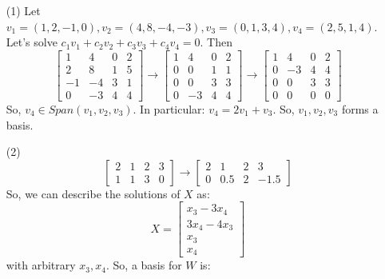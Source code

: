 %
%
\begin{itemize}
\item[(1)]
Let $v_1 = (1, 2, -1, 0), v_2 = (4, 8, -4, -3), v_3 = (0, 1, 3, 4), v_4 = (2, 5, 1, 4)$. Let's solve $c_1v_1 + c_2v_2 + c_3v_3 + c_4v_4 = 0$. Then
$$\begin{bmatrix}
1 & 4 & 0 & 2 \\
2 & 8 & 1 & 5 \\
-1 & -4 & 3 & 1 \\
0 & -3 & 4 & 4
\end{bmatrix} \rightarrow \begin{bmatrix}
1 & 4 & 0 & 2 \\
0 & 0 & 1 & 1 \\
0 & 0 & 3 & 3 \\
0 & -3 & 4 & 4
\end{bmatrix} \rightarrow \begin{bmatrix}
1 & 4 & 0 & 2 \\
0 & -3 & 4 & 4 \\
0 & 0 & 3 & 3 \\
0 & 0 & 0 & 0
\end{bmatrix}$$
So, $v_4 \in Span(v_1, v_2, v_3)$. In particular: $v_4 = 2v_1 + v_3$. So, $v_1, v_2, v_3$ forms a basis.
\item[(2)]
$$\begin{bmatrix}
2 & 1 & 2 & 3 \\
1 & 1 & 3 & 0
\end{bmatrix} \rightarrow \begin{bmatrix}
2 & 1 & 2 & 3 \\
0 & 0.5 & 2 & -1.5
\end{bmatrix}$$
So, we can describe the solutions of $X$ as:
$$X = \begin{bmatrix}
x_3 - 3x_4 \\
3x_4 - 4x_3 \\
x_3 \\
x_4
\end{bmatrix}$$
with arbitrary $x_3, x_4$. So, a basis for $W$ is:

\end{itemize}
